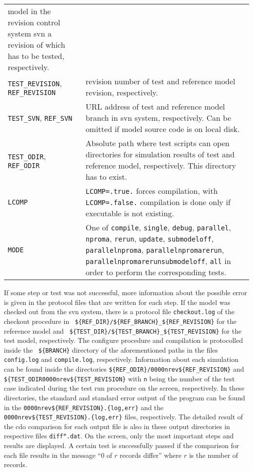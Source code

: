 \begin{longtable}{l@{\extracolsep\fill}p{10cm}}
model in the revision
control system svn a revision of which has to be tested, respectively. \\
{\tt TEST\_REVISION}, {\tt REF\_REVISION} & revision number of
test and reference model revision, respectively. \\
{\tt TEST\_SVN}, {\tt REF\_SVN} & URL address of test and reference model
branch in svn system, respectively. Can be omitted if model source
code is on local disk. \\
{\tt TEST\_ODIR}, {\tt REF\_ODIR} & Absolute path where test scripts
can open directories for simulation results of test and reference
model, respectively. This directory has to exist.\\
{\tt LCOMP} & {\tt LCOMP=.true.} forces compilation, with {\tt
  LCOMP=.false.} compilation is done only if executable is not
existing.\\
{\tt MODE} & One of {\tt compile}, {\tt single}, {\tt debug}, {\tt parallel},
{\tt nproma}, {\tt rerun}, {\tt update}, {\tt submodeloff}, {\tt
  parallelnproma}, {\tt parallelnpromarerun}, {\tt
  parallelnpromarerunsubmodeloff}, {\tt all} in order to perform the
corresponding tests. \\
\end{longtable}

If some step or test was not successful, more information about the
possible error is given in
the protocol files that are written for each step.
If the model was checked out from the svn system, there is a protocol
file {\tt checkout.log} of the checkout procedure in {\tt
    \$\{REF\_DIR\}/\$\{REF\_BRANCH\}\_\$\{REF\_REVISION\}} for the reference
  model and {\tt
    \$\{TEST\_DIR\}/\$\{TEST\_BRANCH\}\_\$\{TEST\_REVISION\}} for the
  test model, respectively. 
The configure procedure and compilation is protocolled inside the {\tt
  \$\{BRANCH\}} directory of the aforementioned paths in the files
{\tt config.log} and {\tt compile.log}, respectively.
Information about each simulation can be found inside the directories
{\tt \$\{REF\_ODIR\}/0000nrev\$\{REF\_REVISION\}} and {\tt
  \$\{TEST\_ODIR\/0000nrev\$\{TEST\_REVISION\}}  
with {\tt n} being the number of the test case indicated during the test
run procedure on the screen, respectively. In these
directories, the standard and standard error output of the \echam{}
program can be found in the {\tt 0000nrev\$\{REF\_REVISION\}.\{log,err\}}
and the {\tt 0000nrev\$\{TEST\_REVISION\}.\{log,err\}} files,
respectively. The detailed result of the cdo comparison for each
output file is also in these output directories in respective files
{\tt diff$\ast$.dat}. On the screen, only the most important steps and
results are displayed. A certain test is successfully passed if the
comparison for each file
results in the message ``0 of $r$ records differ'' where $r$ is the
number of records.


